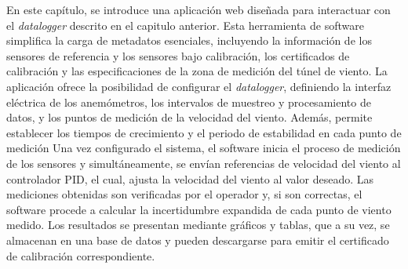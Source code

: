 En este capítulo, se introduce una aplicación web diseñada para interactuar con el \textit{datalogger} descrito en el capitulo anterior. Esta herramienta de software simplifica la carga de metadatos esenciales, incluyendo la información de los sensores de referencia y los sensores bajo calibración, los certificados de calibración y las especificaciones de la zona de medición del túnel de viento. La aplicación ofrece la posibilidad de configurar el \textit{datalogger}, definiendo la interfaz eléctrica de los anemómetros, los intervalos de muestreo y procesamiento de datos, y los puntos de medición de la velocidad del viento. Además, permite establecer los tiempos de crecimiento y el periodo de estabilidad en cada punto de medición Una vez configurado el sistema, el software inicia el proceso de medición de los sensores y simultáneamente, se envían referencias de velocidad del viento al controlador PID, el cual, ajusta la velocidad del viento al valor deseado. Las mediciones obtenidas son verificadas por el operador y, si son correctas, el software procede a calcular la incertidumbre expandida de cada punto de viento medido. Los resultados se presentan mediante gráficos y tablas, que a su vez, se almacenan en una base de datos y pueden descargarse para emitir el certificado de calibración correspondiente.


